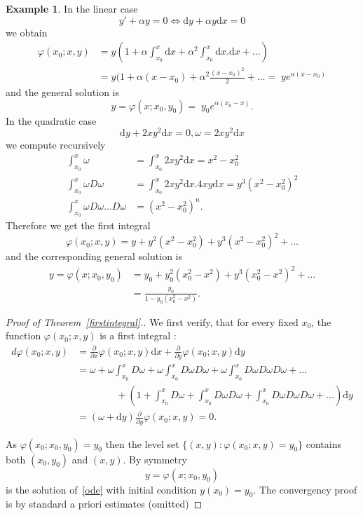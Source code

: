 \documentclass[11pt]{article}
\theoremstyle{definition}
\newtheorem{exam}[theo]{Example}
\numberwithin{equation}{section}
\numberwithin{figure}{section}
\numberwithin{table}{section}
\newcommand*{\dd}{\mathrm{d}}
\newcommand*{\dx}{\dd x}
\newcommand*{\dy}{\dd y}
\begin{document}
\begin{exam}
In the linear case
\[
y' + \alpha y = 0 \iff \dy + \alpha y \dx = 0
\]
we obtain
\begin{align*}
\varphi(x_0;x,y) &= y \left(1+ \alpha \int_{x_0}^x \dx + \alpha^2 \int_{x_0}^x \dx.\dx + \dots\right)\\
&= y(1 + \alpha(x-x_0) + \alpha^2 \frac{(x-x_0)^2}{2} + \dots =\;y e^{\alpha (x-x_0) }
\end{align*}
and the general solution is
\[
y = \varphi(x;x_0,y_0) =\; y_0 e^{\alpha (x_0-x) }.
\]
In the quadratic case
\[
\dy + 2 x y^2 \dx = 0, \omega = 2 x y^2 \dx
\]
we compute recursively
\begin{align*}
\int_{x_0}^x \omega &= \int_{x_0}^x 2 x y^2 \dx = x^2-x_0^2 \\
\int_{x_0}^x \omega D\omega & = \int_{x_0}^x 2 x y^2 \dx. 4 x y \dx = y^3 (x^2-x_0^2)^2 \\
\int_{x_0}^x \omega D\omega \dots D\omega &= (x^2-x_0^2)^n.
\end{align*}
Therefore we get the first integral
\[
\varphi(x_0;x,y) = y + y^2 (x^2-x_0^2) + y^3 (x^2-x_0^2)^2 + \dots
\]
and the corresponding general solution is
\begin{align*}
y= \varphi(x ; x_0,y_0) & = y_0 + y_0^2 (x_0^2-x^2) + y^3 (x^2_0-x^2)^2 + \dots \\
& = \frac{y_0}{1-y_0(x_0^2-x^2)}.
\end{align*}
\end{exam}

\begin{proof}[Proof of Theorem~\ref{firstintegral}.]
We first verify, that for every fixed $x_0$, the function $\varphi(x_0;x,y)$ is a first integral :
\begin{align*}
d\varphi(x_0;x,y)&=\frac{ \partial}{\partial x} \varphi(x_0;x,y) \dx + \frac{ \partial}{\partial y} \varphi(x_0;x,y) \dy \\
&= \omega + \omega \int_{x_0}^x D \omega + \omega \int_{x_0}^x D \omega D \omega + \omega \int_{x_0}^x D \omega D \omega D \omega + \dots \\
&\qquad\qquad+ \left(1 + \int_{x_0}^x D \omega + \int_{x_0}^x D \omega D \omega + \int_{x_0}^x D \omega D \omega D \omega + \dots\right) \dy \\
&= (\omega + \dy) \frac{ \partial}{\partial y} \varphi(x_0;x,y) = 0.
\end{align*}

As $\varphi(x_0;x_0,y_0) = y_0$ then the level set $\{ (x,y) : \varphi(x_0;x,y) = y_0 \}$ contains both $(x_0,y_0)$ and $(x,y)$. By symmetry
\[
y= \varphi(x;x_0,y_0)
\]
is the solution of~\eqref{ode} with initial condition $y(x_0)=y_0$. The convergency proof is by standard a priori estimates (omitted)
\end{proof}
\end{document}

